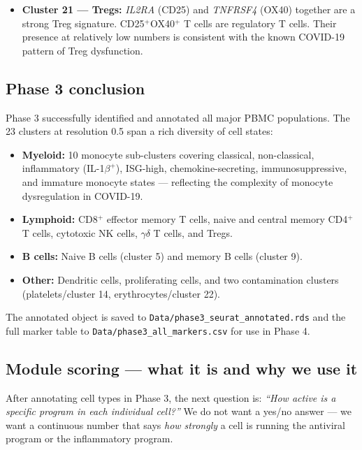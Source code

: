 \documentclass[11pt, a4paper]{article}
\begin{document}
\begin{itemize}[nosep]
  \item \textbf{Cluster 21 — Tregs:}
        \textit{IL2RA} (CD25) and \textit{TNFRSF4} (OX40) together are a
        strong Treg signature. CD25$^+$OX40$^+$ T cells are regulatory T cells.
        Their presence at relatively low numbers is consistent with the known
        COVID-19 pattern of Treg dysfunction.
\end{itemize}

\subsection{Phase 3 conclusion}

Phase 3 successfully identified and annotated all major PBMC populations.
The 23 clusters at resolution 0.5 span a rich diversity of cell states:

\begin{itemize}[nosep]
  \item \textbf{Myeloid:} 10 monocyte sub-clusters covering classical,
        non-classical, inflammatory (IL-1$\beta^+$), ISG-high, chemokine-secreting,
        immunosuppressive, and immature monocyte states — reflecting the
        complexity of monocyte dysregulation in COVID-19.
  \item \textbf{Lymphoid:} CD8$^+$ effector memory T cells, naive and central
        memory CD4$^+$ T cells, cytotoxic NK cells, $\gamma\delta$ T cells,
        and Tregs.
  \item \textbf{B cells:} Naive B cells (cluster 5) and memory B cells (cluster 9).
  \item \textbf{Other:} Dendritic cells, proliferating cells, and two
        contamination clusters (platelets/cluster 14, erythrocytes/cluster 22).
\end{itemize}

The annotated object is saved to \texttt{Data/phase3\_seurat\_annotated.rds}
and the full marker table to \texttt{Data/phase3\_all\_markers.csv}
for use in Phase 4.

\subsection{Module scoring — what it is and why we use it}

After annotating cell types in Phase 3, the next question is:
\textit{``How active is a specific program in each individual cell?''}
We do not want a yes/no answer — we want a continuous number that says
\textit{how strongly} a cell is running the antiviral program or the
inflammatory program.
\end{document}
